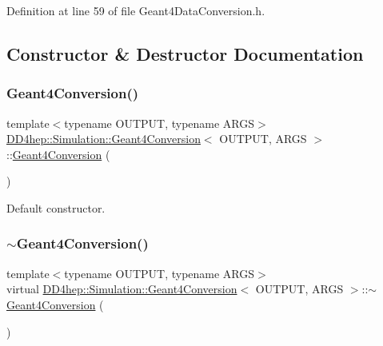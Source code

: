 Definition at line 59 of file Geant4\+Data\+Conversion.\+h.



\subsection{Constructor \& Destructor Documentation}
\hypertarget{class_d_d4hep_1_1_simulation_1_1_geant4_conversion_a1c01751a147e2f8f59c5def99d3b610c}{}\label{class_d_d4hep_1_1_simulation_1_1_geant4_conversion_a1c01751a147e2f8f59c5def99d3b610c} 
\subsubsection{\texorpdfstring{Geant4\+Conversion()}{Geant4Conversion()}}
{\footnotesize\ttfamily template$<$typename O\+U\+T\+P\+UT, typename A\+R\+GS$>$ \\
\hyperlink{class_d_d4hep_1_1_simulation_1_1_geant4_conversion}{D\+D4hep\+::\+Simulation\+::\+Geant4\+Conversion}$<$ O\+U\+T\+P\+UT, A\+R\+GS $>$\+::\hyperlink{class_d_d4hep_1_1_simulation_1_1_geant4_conversion}{Geant4\+Conversion} (\begin{DoxyParamCaption}{ }\end{DoxyParamCaption})}



Default constructor. 

\hypertarget{class_d_d4hep_1_1_simulation_1_1_geant4_conversion_ad45a38e4466edfe39670a783931bdbe6}{}\label{class_d_d4hep_1_1_simulation_1_1_geant4_conversion_ad45a38e4466edfe39670a783931bdbe6} 
\subsubsection{\texorpdfstring{$\sim$\+Geant4\+Conversion()}{~Geant4Conversion()}}
{\footnotesize\ttfamily template$<$typename O\+U\+T\+P\+UT, typename A\+R\+GS$>$ \\
virtual \hyperlink{class_d_d4hep_1_1_simulation_1_1_geant4_conversion}{D\+D4hep\+::\+Simulation\+::\+Geant4\+Conversion}$<$ O\+U\+T\+P\+UT, A\+R\+GS $>$\+::$\sim$\hyperlink{class_d_d4hep_1_1_simulation_1_1_geant4_conversion}{Geant4\+Conversion} (\begin{DoxyParamCaption}{ }\end{DoxyParamCaption})\hspace{0.3cm}{\ttfamily [virtual]}}



